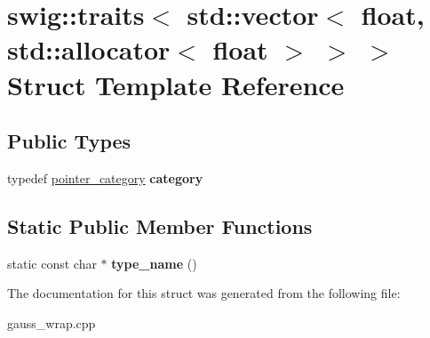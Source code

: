 \hypertarget{structswig_1_1traits_3_01std_1_1vector_3_01float_00_01std_1_1allocator_3_01float_01_4_01_4_01_4}{\section{swig\-:\-:traits$<$ std\-:\-:vector$<$ float, std\-:\-:allocator$<$ float $>$ $>$ $>$ Struct Template Reference}
\label{structswig_1_1traits_3_01std_1_1vector_3_01float_00_01std_1_1allocator_3_01float_01_4_01_4_01_4}
}
\subsection*{Public Types}
\begin{DoxyCompactItemize}
\item 
\hypertarget{structswig_1_1traits_3_01std_1_1vector_3_01float_00_01std_1_1allocator_3_01float_01_4_01_4_01_4_a1debd6f33d28f2b3ca6e512f8f7152f2}{typedef \hyperlink{structswig_1_1pointer__category}{pointer\-\_\-category} {\bfseries category}}\label{structswig_1_1traits_3_01std_1_1vector_3_01float_00_01std_1_1allocator_3_01float_01_4_01_4_01_4_a1debd6f33d28f2b3ca6e512f8f7152f2}

\end{DoxyCompactItemize}
\subsection*{Static Public Member Functions}
\begin{DoxyCompactItemize}
\item 
\hypertarget{structswig_1_1traits_3_01std_1_1vector_3_01float_00_01std_1_1allocator_3_01float_01_4_01_4_01_4_ae1ed533254b96a146fb3f704463fd005}{static const char $\ast$ {\bfseries type\-\_\-name} ()}\label{structswig_1_1traits_3_01std_1_1vector_3_01float_00_01std_1_1allocator_3_01float_01_4_01_4_01_4_ae1ed533254b96a146fb3f704463fd005}

\end{DoxyCompactItemize}


The documentation for this struct was generated from the following file\-:\begin{DoxyCompactItemize}
\item 
gauss\-\_\-wrap.\-cpp\end{DoxyCompactItemize}
